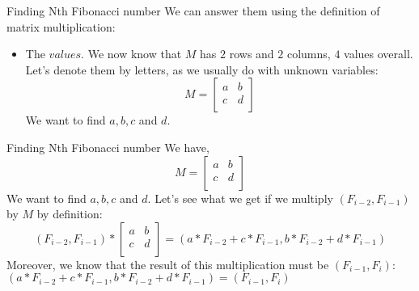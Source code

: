 \documentclass{beamer}
\begin{document}
\begin{frame}{Finding Nth Fibonacci number}
  We can answer them using the definition of matrix multiplication: \newline
  \begin{itemize}
    \item The $values$. \newline \pause
      We now know that $M$ has $2$ rows and $2$ columns, $4$ values overall.
      Let’s denote them by letters, as we usually do with unknown variables:
      \newline \newline
        \[
          M = 
          \left[ {
            \begin{array}{cc}
              a & b \\
              c & d \\      
            \end{array} } 
          \right]
        \]
      \pause
      We want to find $a, b, c$ and $d$.
      \newline
  \end{itemize}
\end{frame}

\begin{frame}{Finding Nth Fibonacci number}
  We have, 
  \[
    M = 
    \left[ {
      \begin{array}{cc}
        a & b \\
        c & d \\      
      \end{array} } 
    \right]
  \]
  \pause
  We want to find $a, b, c$ and $d$.
  \newline
  Let's see what we get if we multiply $(F_{i-2}, F_{i-1})$ by $M$ by definition:  
  \newline \pause
  \[
    (F_{i-2}, F_{i-1})
    *
    \left[ {
      \begin{array}{cc}
        a & b \\
        c & d \\      
      \end{array} } 
    \right]
    =
    (a * F_{i-2} + c * F_{i-1}, b * F_{i-2} + d * F_{i-1})
  \]
  \pause
  Moreover, we know that the result of this multiplication must be $(F_{i-1}, F_i)$:
  \newline
  $(a * F_{i-2} + c * F_{i-1}, b * F_{i-2} + d * F_{i-1}) = (F_{i-1}, F_i)$
\end{frame}
\end{document}
